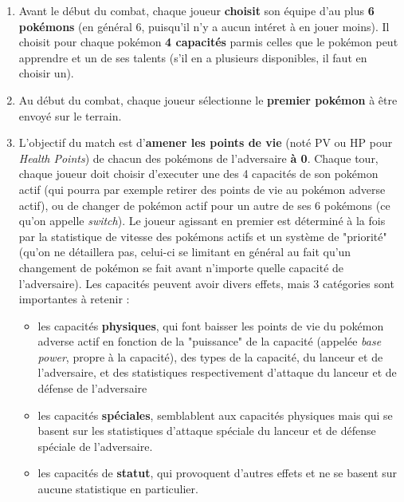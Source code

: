 \documentclass[a4paper,12pt]{article}
\begin{document}
\begin{enumerate}
    \item Avant le début du combat, chaque joueur \textbf{choisit} son équipe
    d'au plus \textbf{6 pokémons} (en général 6, puisqu'il n'y a aucun intéret à
    en jouer moins). Il choisit pour chaque pokémon \textbf{4 capacités} parmis
    celles que le pokémon peut apprendre et un de ses talents (s'il en a
    plusieurs disponibles, il faut en choisir un).
    \item Au début du combat, chaque joueur sélectionne le \textbf{premier
    pokémon} à être envoyé sur le terrain.
    \item L'objectif du match est d'\textbf{amener les points de vie} (noté PV
    ou HP pour \textit{Health Points}) de chacun des pokémons de l'adversaire
    \textbf{à 0}. Chaque tour, chaque joueur doit choisir d'executer une des 4
    capacités de son pokémon actif (qui pourra par exemple retirer des points de
    vie au pokémon adverse actif), ou de changer de pokémon actif pour un autre
    de ses 6 pokémons (ce qu'on appelle \textit{switch}). Le joueur agissant en
    premier est déterminé à la fois par la statistique de vitesse des pokémons
    actifs et un système de "priorité" (qu'on ne détaillera pas, celui-ci se
    limitant en général au fait qu'un changement de pokémon se fait avant
    n'importe quelle capacité de l'adversaire). Les capacités peuvent avoir
    divers effets, mais 3 catégories sont importantes à retenir :
          \begin{itemize}
              \item les capacités \textbf{physiques}, qui font baisser les
              points de vie du pokémon adverse actif en fonction de la
              "puissance" de la capacité (appelée \textit{base power}, propre à
              la capacité), des types de la capacité, du lanceur et de
              l'adversaire, et des statistiques respectivement d'attaque du
              lanceur et de défense de l'adversaire
              \item les capacités \textbf{spéciales}, semblablent aux capacités
              physiques mais qui se basent sur les statistiques d'attaque
              spéciale du lanceur et de défense spéciale de l'adversaire.
              \item les capacités de \textbf{statut}, qui provoquent d'autres
              effets et ne se basent sur aucune statistique en particulier.
          \end{itemize}
\end{enumerate}
\end{document}
